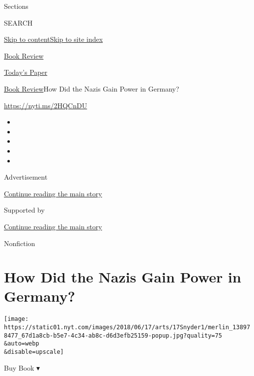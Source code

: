 Sections

SEARCH

\protect\hyperlink{site-content}{Skip to
content}\protect\hyperlink{site-index}{Skip to site index}

\href{https://www.nytimes.com/section/books/review}{Book Review}

\href{https://myaccount.nytimes.com/auth/login?response_type=cookie\&client_id=vi}{}

\href{https://www.nytimes.com/section/todayspaper}{Today's Paper}

\href{/section/books/review}{Book Review}\textbar{}How Did the Nazis
Gain Power in Germany?

\url{https://nyti.ms/2HQCnDU}

\begin{itemize}
\item
\item
\item
\item
\item
\end{itemize}

Advertisement

\protect\hyperlink{after-top}{Continue reading the main story}

Supported by

\protect\hyperlink{after-sponsor}{Continue reading the main story}

Nonfiction

\hypertarget{how-did-the-nazis-gain-power-in-germany}{%
\section{How Did the Nazis Gain Power in
Germany?}\label{how-did-the-nazis-gain-power-in-germany}}

\texttt{[image: https://static01.nyt.com/images/2018/06/17/arts/17Snyder1/merlin\_138978477\_67d1a8cb-b5e7-4c34-ab8c-d6d3efb25159-popup.jpg?quality=75\\\&auto=webp\\\&disable=upscale]}

Buy Book ▾

